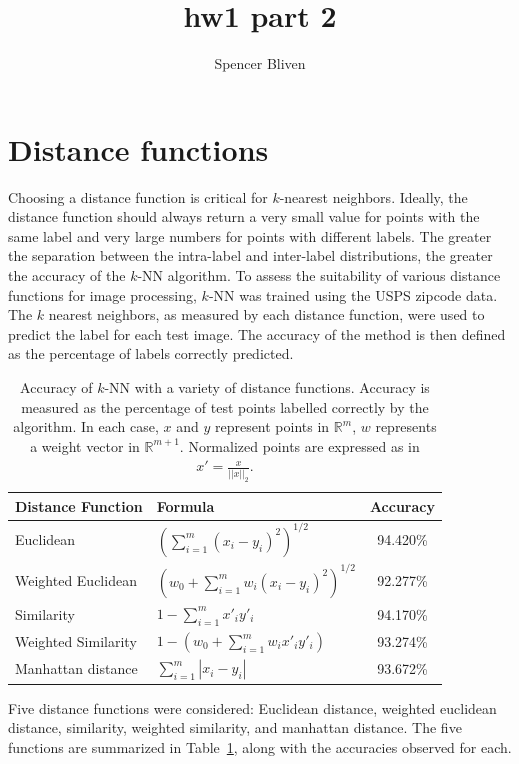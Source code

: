 \documentclass[12pt]{amsart}
\title{hw1 part 2}
\author{Spencer Bliven}
\begin{document}
\maketitle
\section{Distance functions}

Choosing a distance function is critical for $k$-nearest neighbors. Ideally, the distance function should always return a very small value for points with the same label and very large numbers for points with different labels. The greater the separation between the intra-label and inter-label distributions, the greater the accuracy of the $k$-NN algorithm.  To assess the suitability of various distance functions for image processing, $k$-NN was trained using the USPS zipcode data. The $k$ nearest neighbors, as measured by each distance function, were used to predict the label for each test image. The accuracy of the method is then defined as the percentage of labels correctly predicted.

\begin{table}[htdp]
\begin{center}
\begin{tabular}{llc}
\toprule
\bf{Distance Function} & Formula & \bf{Accuracy} \\
\midrule
Euclidean & $\left( \sum_{i=1}^m (x_i-y_i)^2 \right) ^{1/2}$ &
 94.420\% \\
Weighted Euclidean & $ \left( w_0 + \sum_{i=1}^m w_i (x_i-y_i)^2 \right)^{1/2}$ &
 92.277\% \\
Similarity & $1-\sum_{i=1}^m x'_i y'_i $ &
 94.170\% \\
Weighted Similarity & $1-\left(w_0 + \sum_{i=1}^m w_i x'_i y'_i \right) $ &
 93.274\% \\
Manhattan distance & $ \sum_{i=1}^m | x_i-y_i | $ &
 93.672\% \\
\bottomrule
\end{tabular}
\end{center}
\caption{Accuracy of $k$-NN with a variety of distance functions. Accuracy is measured as the percentage of test points labelled correctly by the algorithm. In each case, $x$ and $y$ represent points in $\mathbb{R}^m$, $w$ represents a weight vector in $\mathbb{R}^{m+1}$. Normalized points are expressed as in $x' = \frac{x}{||x||_2}$. }
\label{tab:distfns}
\end{table}

Five distance functions were considered: Euclidean distance, weighted euclidean distance, similarity, weighted similarity, and manhattan distance. The five functions are summarized in Table~\ref{tab:distfns}, along with the accuracies observed for each.
\end{document}
